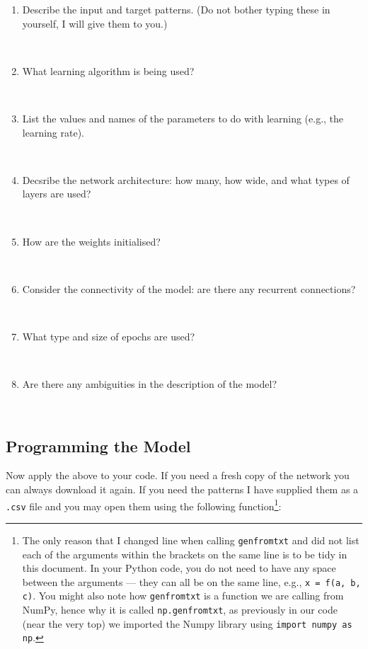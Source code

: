 \documentclass[a4paper,10pt]{article}
\begin{document}
\begin{enumerate}

\item Describe the input and target patterns. (Do not bother typing these in yourself, I will give them to you.)

\ \\

\item What learning algorithm is being used?

\ \\

 \item List the values and names of the parameters to do with learning (e.g., the learning rate).

\ \\

\item Decsribe the network architecture: how many, how wide, and what types of layers are used?

\ \\

\item How are the weights initialised?

\ \\

\item Consider the connectivity of the model: are there any recurrent connections?

\ \\

\item What type and size of epochs are used?

\ \\

 \item Are there any ambiguities in the description of the model?
 
\ \\

\end{enumerate}

\subsection{Programming the Model}


Now apply the above to your code. If you need a fresh copy of the network you can always download it again. If you need the patterns I have supplied them as a \texttt{.csv} file and you may open them using the following function\footnote{The only reason that I changed line when calling \texttt{genfromtxt} and did not list each of the arguments within the brackets on the same line is to be tidy in this document. In your Python code, you do not need to have any space between the arguments --- they can all be on the same line, e.g., \texttt{x = f(a, b, c)}. You might also note how \texttt{genfromtxt} is a function we are calling from NumPy, hence why it is called \texttt{np.genfromtxt}, as previously in our code (near the very top) we imported the Numpy library using \texttt{import numpy as np}.}:
\end{document}
